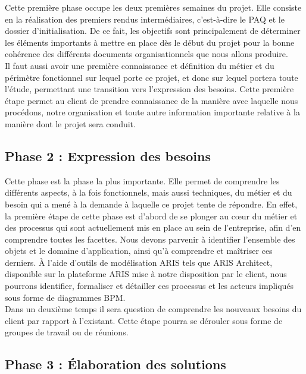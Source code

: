 Cette première phase occupe les deux premières semaines du projet. Elle consiste en la réalisation des premiers rendus intermédiaires, c’est-à-dire le PAQ et le dossier d’initialisation. De ce fait, les objectifs sont principalement de déterminer les éléments importants à mettre en place dès le début du projet pour la bonne cohérence des différents documents organisationnels que nous allons produire. \\

Il faut aussi avoir une première connaissance et définition du métier et du périmètre fonctionnel sur lequel porte ce projet, et donc sur lequel portera toute l’étude, permettant une transition vers l’expression des besoins. Cette première étape permet au client de prendre connaissance de la manière avec laquelle nous procédons, notre organisation et toute autre information importante relative à la manière dont le projet sera conduit.

\subsection{Phase 2 : Expression des besoins}

Cette phase est la phase la plus importante. Elle permet de comprendre les différents aspects, à la fois fonctionnels, mais aussi techniques, du métier et du besoin qui a mené à la demande à laquelle ce projet tente de répondre. En effet, la première étape de cette phase est d’abord de se plonger au c\oe{}ur du métier et des processus qui sont actuellement mis en place au sein de l’entreprise, afin d’en comprendre toutes les facettes. Nous devons parvenir à identifier l’ensemble des objets et le domaine d’application, ainsi qu’à comprendre et maîtriser ces derniers. À l’aide d’outils de modélisation ARIS tels que ARIS Architect, disponible sur la plateforme ARIS mise à notre disposition par le client, nous pourrons identifier, formaliser et détailler ces processus et les acteurs impliqués sous forme de diagrammes BPM. \\

Dans un deuxième temps il sera question de comprendre les nouveaux besoins du client par rapport à l’existant. Cette étape pourra se dérouler sous forme de groupes de travail ou de réunions.

\subsection{Phase 3 : Élaboration des solutions}

